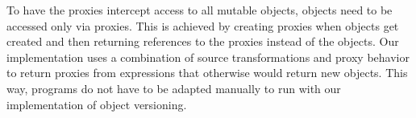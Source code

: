 % 

To have the proxies intercept access to all mutable objects, objects need to be accessed only via proxies.
This is achieved by creating proxies when objects get created and then returning references to the proxies instead of the objects.
Our implementation uses a combination of source transformations and proxy behavior to return proxies from expressions that otherwise would return new objects.
This way, programs do not have to be adapted manually to run with our implementation of object versioning.

